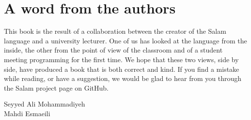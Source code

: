 \section*{A word from the authors}

This book is the result of a collaboration between the creator of the Salam
language and a university lecturer. One of us has looked at the language
from the inside, the other from the point of view of the classroom and of a
student meeting programming for the first time. We hope that these two views,
side by side, have produced a book that is both correct and kind. If you find
a mistake while reading, or have a suggestion, we would be glad to hear from
you through the Salam project page on GitHub.

\begin{flushright}
Seyyed Ali Mohammadiyeh\\
Mahdi Esmaeili
\end{flushright}
\clearpage
